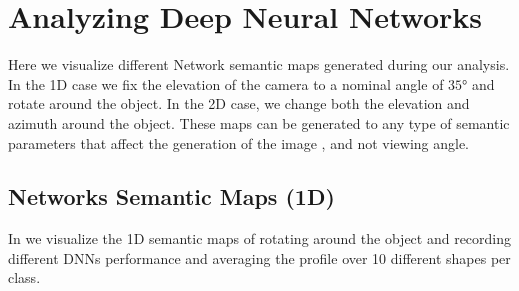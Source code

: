 \clearpage
\appendix 

\section{Analyzing Deep Neural Networks}
Here we visualize different Network semantic maps generated during our analysis. In the 1D case we fix the elevation of the camera to a nominal angle of $\ang{35}$ and rotate around the object. In the 2D case, we change both the elevation and azimuth around the object. These maps can be generated to any type of semantic parameters that affect the generation of the image , and not viewing angle. 
\subsection{Networks Semantic Maps (1D)}
In \figLabel{\ref{fig:nsm1d-1},\ref{fig:nsm1d-2}} we visualize the 1D semantic maps of rotating around the object and recording different DNNs performance and averaging the profile over 10 different shapes per class.

